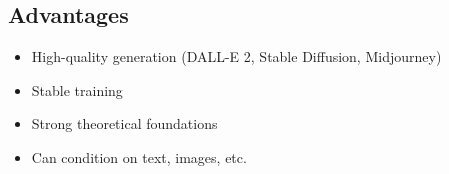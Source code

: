 \subsection{Advantages}

\begin{itemize}
    \item High-quality generation (DALL-E 2, Stable Diffusion, Midjourney)
    \item Stable training
    \item Strong theoretical foundations
    \item Can condition on text, images, etc.
\end{itemize}






